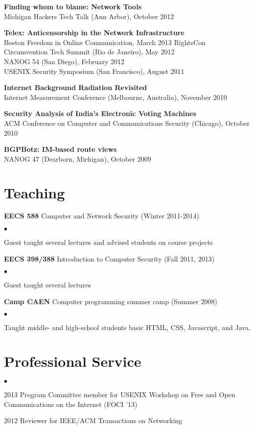 \documentclass{res}
\newcommand{\sqitem}{\item[\tiny$\blacksquare$]}
\newcommand{\sqlist}{\begin{list}{$\bullet$}
  { \setlength{\itemsep}{0pt}
	\setlength{\parsep}{0pt}
	\setlength{\topsep}{0pt}
	\setlength{\partopsep}{0pt}
	\setlength{\leftmargin}{6.0em}
	\setlength{\labelsep}{2.5em} } }
\newcommand{\sqend}{\end{list}}
\begin{document}
\begin{resume}
    \textbf{Finding whom to blame: Network Tools} \\
    Michigan Hackers Tech Talk (Ann Arbor), October 2012

    \textbf{Telex: Anticensorship in the Network Infrastructure} \\
    Boston Freedom in Online Communication, March 2013
    RightsCon Circumvention Tech Summit (Rio de Janeiro), May 2012 \\
    NANOG 54 (San Diego), February 2012 \\
    USENIX Security Symposium (San Francisco), August 2011

    \textbf{Internet Background Radiation Revisited} \\
    Internet Measurement Conference (Melbourne, Australia), November 2010

    \textbf{Security Analysis of India's Electronic Voting Machines} \\
    ACM Conference on Computer and Communications Security (Chicago), October 2010

    \textbf{BGPBotz: IM-based route views} \\
    NANOG 47 (Dearborn, Michigan), October 2009

\section{Teaching}
    \textbf{EECS 588} Computer and Network Security (Winter 2011-2014)
        \sqlist
        \sqitem Guest taught several lectures and advised students on course projects
        \sqend

    \textbf{EECS 398/388} Introduction to Computer Security (Fall 2011, 2013)
        \sqlist
        \sqitem Guest taught several lectures
        \sqend

    \textbf{Camp CAEN} Computer programming summer camp (Summer 2008)
        \sqlist
        \sqitem Taught middle- and high-school students basic HTML, CSS, Javascript, and Java.
        \sqend

\section{Professional Service}
    \sqlist
    \sqitem 2013 Program Committee member for USENIX Workshop on Free and Open Communications on the Internet (FOCI '13)
    \sqitem 2012 Reviewer for IEEE/ACM Transactions on Networking
    \sqend


\end{resume}
\end{document}
